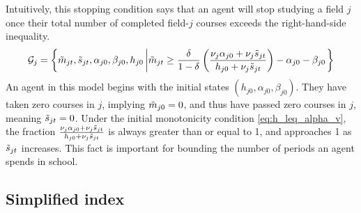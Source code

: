 Intuitively, this stopping condition says that an agent will stop studying a field $j$ once their total number of completed field-$j$ courses exceeds the right-hand-side inequality.
\begin{equation}\label{eq:graduation_monotonicity}
     \mathcal{G}_j = 
     \left\{ \tilde{m}_{jt}, \tilde{s}_{jt}, \alpha_{j0}, \beta_{j0}, h_{j0} \left\vert
     \tilde{m}_{jt} \geq \frac{\delta}{1 - \delta}
    \left( 
        \frac{\nu_j \alpha_{j0} + \nu_j \tilde{s}_{j t}}{h_{j0} + \nu_j \tilde{s}_{j t}}
     \right) - \alpha_{j0} - \beta_{j0}
     \right. \right\}
 \end{equation} 
An agent in this model begins with the initial states $(h_{j0}, \alpha_{j0}, \beta_{j0})$. They have taken zero courses in $j$, implying $\tilde{m}_{j0} = 0$, and thus have passed zero courses in $j$, meaning $\tilde{s}_{j t} = 0$.
Under the initial monotonicity condition \eqref{eq:h_leq_alpha_v}, the fraction $\frac{\nu_j \alpha_{j0} + \nu_j \tilde{s}_{j t}}{h_{j0} + \nu_j \tilde{s}_{j t}}$ is always greater than or equal to 1, and approaches 1 as $\tilde{s}_{j t}$ increases.
This fact is important for bounding the number of periods an agent spends in school.


\subsection{Simplified index}\label{sec:evaluating_index}

